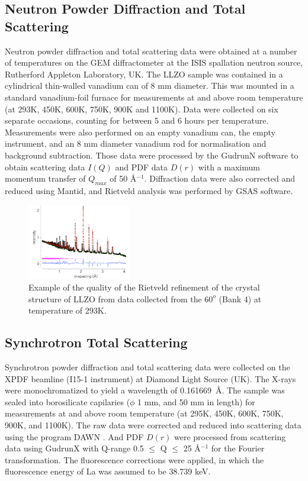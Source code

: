 \documentclass[twoside,twocolumn,9pt]{article}
\begin{document}
\subsection{Neutron Powder Diffraction and Total Scattering}

Neutron powder diffraction and total scattering data were obtained at a number of temperatures on the GEM diffractometer at the
ISIS spallation neutron source, Rutherford Appleton Laboratory, UK. The LLZO sample was contained in a cylindrical thin-walled vanadium can of 8 mm diameter.
This was mounted in a standard vanadium-foil furnace for measurements at and above room temperature (at 293K, 450K, 600K, 750K,
900K and 1100K). Data were collected on six separate occasions, counting for between 5 and 6 hours per temperature.
Measurements were also performed on an empty vanadium can, the empty instrument, and an 8 mm diameter vanadium rod for normalisation and background subtraction.
Those data were processed by the GudrunN software to obtain scattering data $I(Q)$ and PDF data $D(r)$  with a maximum momentum transfer of $Q_{max}$ of 50 \AA$^{-1}$.
Diffraction data were also corrected and reduced using Mantid, and Rietveld analysis was performed by GSAS software.

\begin{figure}[t]
\begin{center}
\includegraphics[width=0.4\textwidth]{Pics/gsas.pdf}
\caption{Example of the quality of the Rietveld refinement of the crystal structure
 of LLZO from data collected from the $60^o$ (Bank 4) at temperature of 293K.}
\label{fig:gsas}
\end{center}
\end{figure}

\subsection{Synchrotron  Total Scattering}
Synchrotron powder diffraction and total scattering data were collected on the XPDF beamline (I15-1 instrument) at Diamond Light Source (UK).
The X-rays were monochromatized to yield a wavelength of 0.161669~\AA.
The sample was sealed into borosilicate capilaries ($\phi$ 1 mm, and 50 mm in length) for measurements at and above room temperature
(at 295K, 450K, 600K, 750K, 900K, and 1100K).
The raw data  were corrected and reduced into scattering data using the program DAWN \cite{S1600577515002283}.
And PDF $D(r)$ were processed from scattering data using GudrunX with Q-range 0.5 $\le$ Q $\le$ 25 \AA$^{-1}$ for the Fourier transformation.
The fluorescence corrections were applied, in which the fluorescence energy of La was assumed to be 38.739 keV.
\end{document}
